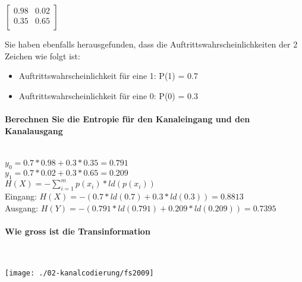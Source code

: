 $\begin{bmatrix}
    0.98 & 0.02\\
    0.35 & 0.65\\
\end{bmatrix}$

Sie haben ebenfalls herausgefunden, dass die Auftrittswahrscheinlichkeiten der 2 Zeichen wie folgt ist:
\begin{itemize}
    \item Auftrittswahrscheinlichkeit für eine 1: P(1) = 0.7
    \item Auftrittswahrscheinlichkeit für eine 0: P(0) = 0.3
\end{itemize}

\paragraph{Berechnen Sie die Entropie für den Kanaleingang und den Kanalausgang}\mbox{}\\
$y_0=0.7*0.98+0.3*0.35=0.791$\\
$y_1=0.7*0.02+0.3*0.65=0.209$\\

$H(X)=-\sum_{i=1}^mp(x_i)*ld(p(x_i))$\\
Eingang: $H(X)=-(0.7*ld(0.7)+0.3*ld(0.3))=0.8813$\\
Ausgang: $H(Y)=-(0.791*ld(0.791)+0.209*ld(0.209))=0.7395$

\paragraph{Wie gross ist die Transinformation}\mbox{}\\
\begin{center}
    \vspace{-8pt}
    \texttt{[image: ./02-kanalcodierung/fs2009]}
    \vspace{-8pt}
\end{center}



